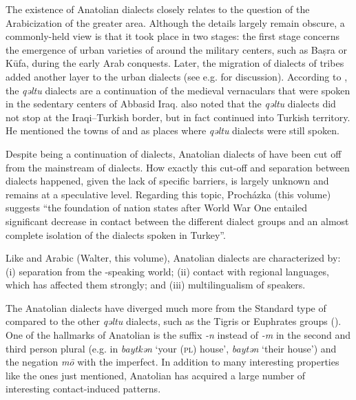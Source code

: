 \documentclass[output=paper]{langsci/langscibook}
\begin{document}
The existence of Anatolian dialects closely relates to the question of the Arabicization of the greater  area. Although the details largely remain obscure, a commonly-held view is that it took place in two stages: the first stage concerns the emergence of urban varieties of  around the military centers, such as Ba\d{s}ra or K\={u}fa, during the early Arab conquests. Later, the migration of  dialects of tribes added another layer to the urban dialects (see e.g. \citealt{Blanc1964,Versteegh1997,Jastrow2006} for discussion). According to \cite{Blanc1964}, the \textit{qəltu} dialects are a continuation of the medieval vernaculars that were spoken in the sedentary centers of Abbasid Iraq. \cite{Blanc1964} also noted that the \textit{qəltu} dialects did not stop at the {Iraqi}--{Turkish} border, but in fact continued into Turkish territory. He mentioned the towns of  and  as places where \textit{qəltu} dialects were still spoken.

Despite being a continuation of  dialects, Anatolian dialects of  have been cut off from the mainstream of  dialects. How exactly this cut-off and separation between dialects happened, given the lack of specific barriers, is largely unknown and remains at a speculative level. Regarding this topic, Proch\'{a}zka (this volume) suggests ``the foundation of nation states after World War One entailed significant decrease in contact between the different dialect groups and an almost complete isolation of the  dialects spoken in Turkey''.

Like   and  Arabic (Walter, this volume), Anatolian  dialects are characterized by: (i) separation from the -speaking world; (ii) contact with regional languages, which has affected them strongly; and (iii) multilingualism of speakers. %

The Anatolian dialects have diverged much more from the Standard type of  compared to the other \textit{qəltu} dialects, such as the Tigris or Euphrates groups (\citealt{Jastrow2011iraq}). One of the hallmarks of Anatolian  is the suffix \textit{-n} instead of \textit{-m} in the second and third person plural (e.g. in   \textit{baytkən} `your (\textsc{pl}) house', \textit{baytən} `their house') and the {negation} \textit{m\={o}} with the imperfect. In addition to many interesting properties like the ones just mentioned, Anatolian  has acquired a large number of interesting contact-induced patterns.
\end{document}
